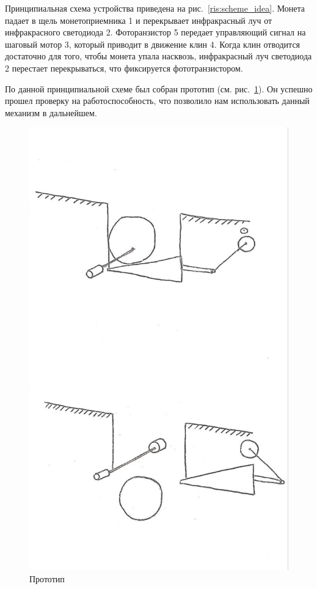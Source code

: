 Принципиальная схема устройства приведена на рис.~\ref{ris:scheme_idea}. Монета падает в щель монетоприемника 1 и перекрывает инфракрасный луч от инфракрасного светодиода 2. Фоторанзистор 5 передает управляющий сигнал на шаговый мотор 3, который приводит в движение клин 4. Когда клин отводится достаточно для того, чтобы монета упала насквозь, инфракрасный луч светодиода 2 перестает перекрываться, что фиксируется фототранзистором. 



По данной принципиальной схеме был собран прототип (см. рис.~\ref{ris:proto}). Он успешно прошел проверку на работоспособность, что позволило нам использовать данный механизм в дальнейшем.

\begin{figure}[H]
	\centering
	\includegraphics[width=12cm]{scheme_idea.jpg}
	\caption{Прототип}
	\label{ris:proto}
\end{figure}
\par\medskip

